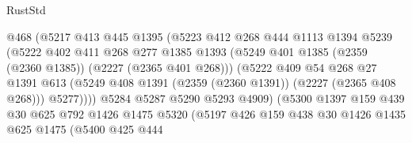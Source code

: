 \begin{lexlean}{RustStd}
\begin{coremodule}
                              @468
                              (@5217
                                @413
                                @445
                                @1395
                                (@5223
                                  @412
                                  @268
                                  @444
                                  @1113
                                  @1394
                                  @5239
                                  (@5222
                                    @402
                                    @411
                                    @268
                                    @277
                                    @1385
                                    @1393
                                    (@5249
                                      @401
                                      @1385
                                      (@2359 (@2360 @1385))
                                      (@2227 (@2365 @401 @268)))
                                    (@5222
                                      @409
                                      @54
                                      @268
                                      @27
                                      @1391
                                      @613
                                      (@5249
                                        @408
                                        @1391
                                        (@2359 (@2360 @1391))
                                        (@2227 (@2365 @408 @268)))
                                      @5277))))
                              @5284
                              @5287
                              @5290
                              @5293
                              @4909)
                            (@5300
                              @1397
                              @159
                              @439
                              @30
                              @625
                              @792
                              @1426
                              @1475
                              @5320
                              (@5197
                                @426
                                @159
                                @438
                                @30
                                @1426
                                @1435
                                @625
                                @1475
                                (@5400
                                  @425
                                  @444

\end{coremodule}
\end{lexlean}
